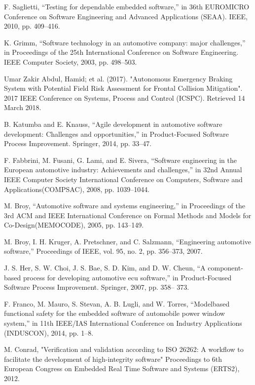 \documentclass[a4paper]{article}
\begin{document}
\begin{thebibliography}{9}
F. Saglietti, “Testing for dependable embedded software,” in 36th EUROMICRO Conference on Software Engineering and Advanced Applications (SEAA). IEEE, 2010, pp. 409–416.
 
K. Grimm, “Software technology in an automotive company: major challenges,” in Proceedings of the 25th International Conference on Software Engineering. IEEE Computer Society, 2003, pp. 498–503.
 
Umar Zakir Abdul, Hamid; et al. (2017). "Autonomous Emergency Braking System with Potential Field Risk Assessment for Frontal Collision Mitigation". 2017 IEEE Conference on Systems, Process and Control (ICSPC). Retrieved 14 March 2018.

B. Katumba and E. Knauss, “Agile development in automotive software development: Challenges and opportunities,” in Product-Focused Software Process Improvement. Springer, 2014, pp. 33–47. 

F. Fabbrini, M. Fusani, G. Lami, and E. Sivera, “Software engineering in the European automotive industry: Achievements and challenges,” in 32nd Annual IEEE Computer Society International Conference on Computers, Software and Applications(COMPSAC), 2008, pp. 1039–1044.

M. Broy, “Automotive software and systems engineering,” in Proceedings of the 3rd ACM and IEEE International Conference on Formal Methods and Models for Co-Design(MEMOCODE), 2005, pp. 143–149. 

M. Broy, I. H. Kruger, A. Pretschner, and C. Salzmann, “Engineering automotive software,” Proceedings of IEEE, vol. 95, no. 2, pp. 356–373, 2007. 

J. S. Her, S. W. Choi, J. S. Bae, S. D. Kim, and D. W. Cheun, “A component-based process for developing automotive ecu software,” in Product-Focused Software Process Improvement. Springer, 2007, pp. 358– 373.

F. Franco, M. Mauro, S. Stevan, A. B. Lugli, and W. Torres, “Modelbased functional safety for the embedded software of automobile power window system,” in 11th IEEE/IAS International Conference on Industry Applications (INDUSCON), 2014, pp. 1–8. 

M. Conrad, "Verification and validation according to ISO 26262: A workflow to facilitate the development of high-integrity software" Proceedings to 6th European Congress on Embedded Real Time Software and Systems (ERTS2), 2012. 


\end{thebibliography}
\end{document}
